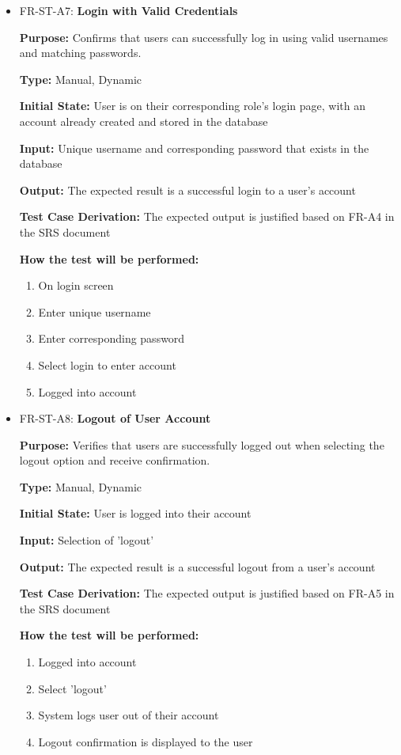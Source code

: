 \documentclass[12pt, titlepage]{article}
\begin{document}
\begin{itemize}
  \item FR-ST-A7: \textbf{Login with Valid Credentials}
  \begin{mdframed}[linewidth=0.5mm]
      \textbf{Purpose:} Confirms that users can successfully log in using valid usernames and matching passwords. \par
      \textbf{Type:} Manual, Dynamic \par
      \textbf{Initial State:} User is on their corresponding role's login page, with an account already created and stored in the database \par
      \textbf{Input:} Unique username and corresponding password that exists in the database \par
      \textbf{Output:} The expected result is a successful login to a user's account \par
      \textbf{Test Case Derivation:} The expected output is justified based on FR-A4 in the SRS document \par
      \textbf{How the test will be performed:}
      \begin{enumerate}[noitemsep]
        \item On login screen
        \item Enter unique username
        \item Enter corresponding password
        \item Select login to enter account
        \item Logged into account
      \end{enumerate}
  \end{mdframed}

  \item FR-ST-A8: \textbf{Logout of User Account}
  \begin{mdframed}[linewidth=0.5mm]
      \textbf{Purpose:} Verifies that users are successfully logged out when selecting the logout option and receive confirmation. \par
      \textbf{Type:} Manual, Dynamic \par
      \textbf{Initial State:} User is logged into their account \par
      \textbf{Input:} Selection of 'logout' \par
      \textbf{Output:} The expected result is a successful logout from a user's account \par
      \textbf{Test Case Derivation:} The expected output is justified based on FR-A5 in the SRS document \par
      \textbf{How the test will be performed:}
      \begin{enumerate}[noitemsep]
        \item Logged into account
        \item Select 'logout'
        \item System logs user out of their account
        \item Logout confirmation is displayed to the user
      \end{enumerate}
  \end{mdframed}
\end{itemize}
\end{document}
